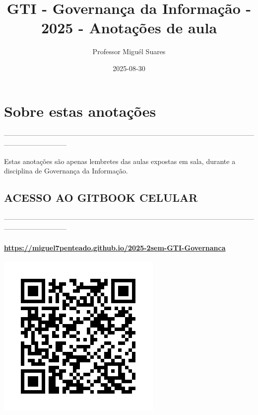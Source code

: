 \documentclass[
]{book}
\title{GTI - Governança da Informação - 2025 - Anotações de aula}
\author{Professor Miguél Suares}
\date{2025-08-30}
\begin{document}
\maketitle

{
\setcounter{tocdepth}{1}
\tableofcontents
}
\chapter*{Sobre estas anotações}\label{sobre-estas-anotauxe7uxf5es}

---------------------------------------------------------------------------------------------------------------------------------------

Estas anotações são apenas lembretes das aulas expostas em sala, durante a disciplina de Governança da Informação.

\section{ACESSO AO GITBOOK CELULAR}\label{acesso-ao-gitbook-celular}

---------------------------------------------------------------------------------------------------------------------------------------

\subsubsection{\texorpdfstring{\url{https://miguel7penteado.github.io/2025-2sem-GTI-Governanca}}{https://miguel7penteado.github.io/2025-2sem-GTI-Governanca}}\label{httpsmiguel7penteado.github.io2025-2sem-gti-governanca}

\includegraphics{images/qr-code-disciplina.jpg}
\end{document}
